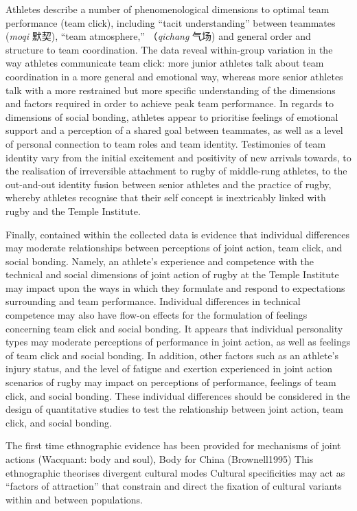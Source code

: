   Athletes describe a number of phenomenological dimensions to optimal team performance (team click), including ``tacit understanding'' between teammates (\textit{moqi} 默契), ``team atmosphere,'' （\textit{qichang} 气场) and general order and structure to team coordination.  The data reveal within-group variation in the way athletes communicate team click: more junior athletes talk about team coordination in a more general and emotional way, whereas more senior athletes talk with a more restrained but more specific understanding of the dimensions and factors required in order to achieve peak team performance.  In regards to dimensions of social bonding, athletes appear to prioritise feelings of emotional support and a perception of a shared goal between teammates, as well as a level of personal connection to team roles and team identity.  Testimonies of team identity vary from the initial excitement and positivity of new arrivals towards, to the realisation of irreversible attachment to rugby of middle-rung athletes, to the out-and-out identity fusion between senior athletes and the practice of rugby, whereby athletes recognise that their self concept is inextricably linked with rugby and the Temple Institute.

  Finally, contained within the collected data is evidence that individual differences may moderate relationships between perceptions of joint action, team click, and social bonding.  Namely, an athlete's experience and competence with the technical and social dimensions of joint action of rugby at the Temple Institute may impact upon the ways in which they formulate and respond to expectations surrounding and team performance.  Individual differences in technical competence may also have flow-on effects for the formulation of feelings concerning team click and social bonding. It appears that individual personality types may moderate perceptions of performance in joint action, as well as feelings of team click and social bonding. In addition, other factors such as an athlete's injury status, and the level of fatigue and exertion experienced in joint action scenarios of rugby may impact on perceptions of performance, feelings of team click, and social bonding.  These individual differences should be considered in the design of quantitative studies to test the relationship between joint action, team click, and social bonding.



  The first time ethnographic evidence has been provided for mechanisms of joint actions (Wacquant: body and soul), Body for China (Brownell1995)
  This ethnographic theorises divergent cultural modes
  Cultural specificities may act as ``factors of attraction'' \citep{Sperber2014} that constrain and direct the fixation of cultural variants within and between populations.














